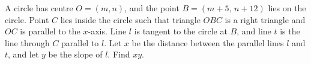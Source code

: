 A circle has centre $O=(m,n)$, and the point $B=(m+5,\,n+12)$ lies on the circle. Point $C$ lies inside the circle such that triangle $OBC$ is a right triangle and $OC$ is parallel to the $x$-axis. Line $l$ is tangent to the circle at $B$, and line $t$ is the line through $C$ parallel to $l$. Let $x$ be the distance between the parallel lines $l$ and $t$, and let $y$ be the slope of $l$. Find $xy$.
